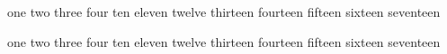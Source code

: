one 
    two three four  ten eleven
twelve thirteen
    fourteen fifteen sixteen seventeen

one 
    two three four  ten eleven
twelve thirteen
    fourteen fifteen sixteen seventeen
